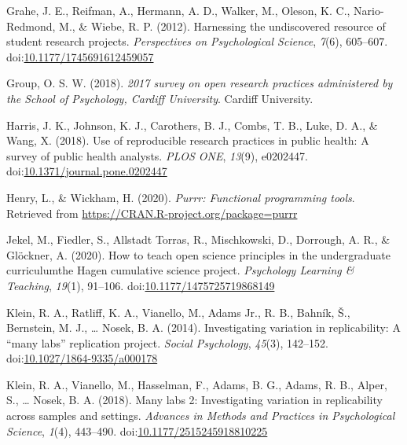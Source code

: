 \documentclass[
  man,mask,floatsintext]{apa6}
\newlength{\cslhangindent}
\newenvironment{cslreferences}%
  {\setlength{\parindent}{0pt}%
  \everypar{\setlength{\hangindent}{\cslhangindent}}\ignorespaces}%
  {\par}
\begin{document}
\begin{cslreferences}
\leavevmode\hypertarget{ref-graheHarnessingUndiscoveredResource2012}{}%
Grahe, J. E., Reifman, A., Hermann, A. D., Walker, M., Oleson, K. C., Nario-Redmond, M., \& Wiebe, R. P. (2012). Harnessing the undiscovered resource of student research projects. \emph{Perspectives on Psychological Science}, \emph{7}(6), 605--607. doi:\href{https://doi.org/10.1177/1745691612459057}{10.1177/1745691612459057}

\leavevmode\hypertarget{ref-openscienceworkinggroup2017SurveyOpen2018}{}%
Group, O. S. W. (2018). \emph{2017 survey on open research practices administered by the School of Psychology, Cardiff University}. Cardiff University.

\leavevmode\hypertarget{ref-harrisUseReproducibleResearch2018}{}%
Harris, J. K., Johnson, K. J., Carothers, B. J., Combs, T. B., Luke, D. A., \& Wang, X. (2018). Use of reproducible research practices in public health: A survey of public health analysts. \emph{PLOS ONE}, \emph{13}(9), e0202447. doi:\href{https://doi.org/10.1371/journal.pone.0202447}{10.1371/journal.pone.0202447}

\leavevmode\hypertarget{ref-R-purrr}{}%
Henry, L., \& Wickham, H. (2020). \emph{Purrr: Functional programming tools}. Retrieved from \url{https://CRAN.R-project.org/package=purrr}

\leavevmode\hypertarget{ref-jekelHowTeachOpen2020}{}%
Jekel, M., Fiedler, S., Allstadt Torras, R., Mischkowski, D., Dorrough, A. R., \& Glöckner, A. (2020). How to teach open science principles in the undergraduate curriculumthe Hagen cumulative science project. \emph{Psychology Learning \& Teaching}, \emph{19}(1), 91--106. doi:\href{https://doi.org/10.1177/1475725719868149}{10.1177/1475725719868149}

\leavevmode\hypertarget{ref-kleinInvestigatingVariationReplicability2014}{}%
Klein, R. A., Ratliff, K. A., Vianello, M., Adams Jr., R. B., Bahník, Š., Bernstein, M. J., \ldots{} Nosek, B. A. (2014). Investigating variation in replicability: A ``many labs'' replication project. \emph{Social Psychology}, \emph{45}(3), 142--152. doi:\href{https://doi.org/10.1027/1864-9335/a000178}{10.1027/1864-9335/a000178}

\leavevmode\hypertarget{ref-kleinManyLabsInvestigating2018}{}%
Klein, R. A., Vianello, M., Hasselman, F., Adams, B. G., Adams, R. B., Alper, S., \ldots{} Nosek, B. A. (2018). Many labs 2: Investigating variation in replicability across samples and settings. \emph{Advances in Methods and Practices in Psychological Science}, \emph{1}(4), 443--490. doi:\href{https://doi.org/10.1177/2515245918810225}{10.1177/2515245918810225}


\end{cslreferences}
\end{document}
